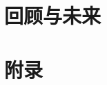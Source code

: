 \documentclass[11pt,twoside]{book} %
\begin{document}




\part{回顾与未来}


\part{附录}










\end{document}
